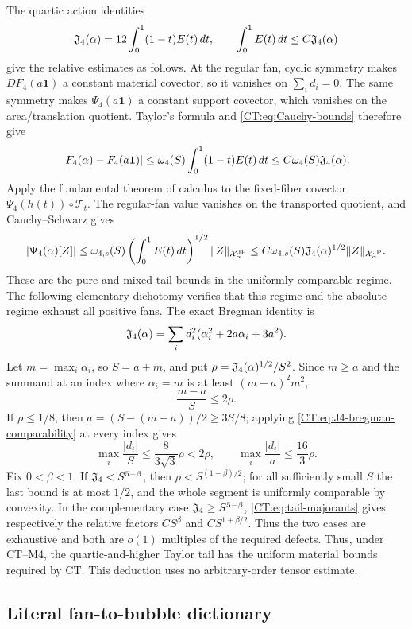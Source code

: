 The quartic action identities
\begin{equation}\label{CT:eq:action}
 \mathfrak J_4(\alpha)=12\int_0^1(1-t)E(t)\,dt,
 \qquad
 \int_0^1E(t)\,dt\le C\mathfrak J_4(\alpha)
\end{equation}
give the relative estimates as follows.  At the regular fan, cyclic
symmetry makes $DF_4(a\mathbf1)$ a constant material covector, so it
vanishes on $\sum_i d_i=0$.  The same symmetry makes
$\Psi_4(a\mathbf1)$ a constant support covector, which vanishes on the
area/translation quotient.  Taylor's formula and \eqref{CT:eq:Cauchy-bounds}
therefore give
\[
 |F_4(\alpha)-F_4(a\mathbf1)|
 \le \omega_4(S)\int_0^1(1-t)E(t)\,dt
 \le C\omega_4(S)\mathfrak J_4(\alpha).
\]
Apply the fundamental theorem of calculus to the fixed-fiber covector
$\Psi_4(h(t))\circ\mathcal T_t$.  The regular-fan value vanishes on the
transported quotient, and Cauchy--Schwarz gives
\[
 |\Psi_4(\alpha)[Z]|
 \le \omega_{4,s}(S)\left(\int_0^1E(t)\,dt\right)^{1/2}
       \|Z\|_{\mathcal X^{\rm JP}_\alpha}
 \le C\omega_{4,s}(S)\mathfrak J_4(\alpha)^{1/2}\|Z\|_{\mathcal X^{\rm JP}_\alpha}.
\]
These are the pure and mixed tail bounds in the uniformly comparable
regime.  The following elementary dichotomy verifies that this regime and
the absolute regime exhaust all positive fans.  The exact Bregman identity
is
\begin{equation}\label{CT:eq:J4-bregman-comparability}
 \mathfrak J_4(\alpha)=\sum_i d_i^2
  (\alpha_i^2+2a\alpha_i+3a^2).
\end{equation}
Let $m=\max_i\alpha_i$, so $S=a+m$, and put
$\rho=\mathfrak J_4(\alpha)^{1/2}/S^2$.  Since $m\ge a$ and the summand at an
index where $\alpha_i=m$ is at least $(m-a)^2m^2$,
\[
 \frac{m-a}{S}\le2\rho.
\]
If $\rho\le1/8$, then $a=(S-(m-a))/2\ge3S/8$; applying
\eqref{CT:eq:J4-bregman-comparability} at every index gives
\[
 \max_i\frac{|d_i|}{S}
 \le\frac{8}{3\sqrt3}\rho<2\rho,
 \qquad
 \max_i\frac{|d_i|}{a}\le\frac{16}{3}\rho.
\]
Fix $0<\beta<1$.  If $\mathfrak J_4<S^{5-\beta}$, then
$\rho<S^{(1-\beta)/2}$; for all sufficiently small $S$ the last bound is
at most $1/2$, and the whole segment is uniformly comparable by convexity.
In the complementary case $\mathfrak J_4\ge S^{5-\beta}$,
\eqref{CT:eq:tail-majorants} gives respectively the relative factors
$CS^\beta$ and $CS^{1+\beta/2}$.  Thus the two cases are exhaustive and
both are $o(1)$ multiples of the required defects.
Thus, under CT--M4, the quartic-and-higher Taylor tail has the uniform
material bounds required by CT.  This deduction uses no arbitrary-order
tensor estimate.

\subsection{Literal fan-to-bubble dictionary}

